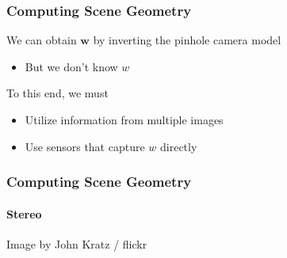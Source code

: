 \documentclass[xetex,professionalfont]{beamer}
\renewcommand{\vec}[1]{\ensuremath{\mathbf{#1}}}
\newcommand{\vw}{\vec{w}}
\begin{document}
\begin{frame}
\frametitle{Computing Scene Geometry}

We can obtain $\vw$ by inverting the pinhole camera model %
\begin{itemize}
    \item But we don't know $w$ %
\end{itemize}

\bigskip
To this end, we must
\begin{itemize}
    \item Utilize information from multiple images %
    \item Use sensors that capture $w$ directly
\end{itemize}


\end{frame}


\begin{frame}
\frametitle{Computing Scene Geometry}
\framesubtitle{Stereo}

\begin{center}
    {\centering Image by John Kratz / flickr}
\end{center}

\end{frame}
\end{document}
